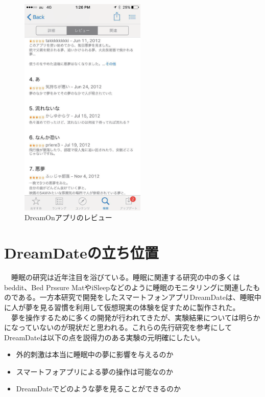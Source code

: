 \begin{figure}[htbp]
\begin{center}
\includegraphics[width=6cm]{eps/dreamOn.eps}
\caption{DreamOnアプリのレビュー}
\label{DreamOnImage}
\end{center}
\end{figure}

\section{DreamDateの立ち位置}
　睡眠の研究は近年注目を浴びている。睡眠に関連する研究の中の多くはbeddit\cite{beddit}、Bed Prssure MatやiSleep\cite{iSleep}などのように睡眠のモニタリングに関連したものである。一方本研究で開発をしたスマートフォンアプリDreamDateは、睡眠中に人が夢を見る習慣を利用して仮想現実の体験を促すために製作された。\\
　夢を操作するために多くの開発が行われてきたが、実験結果については明らかになっていないのが現状だと思われる。これらの先行研究を参考にしてDreamDateは以下の点を説得力のある実験の元明確にしたい。

\begin{itemize}
\item 外的刺激は本当に睡眠中の夢に影響を与えるのか
\item スマートフォアプリによる夢の操作は可能なのか
\item DreamDateでどのような夢を見ることができるのか
\end{itemize}